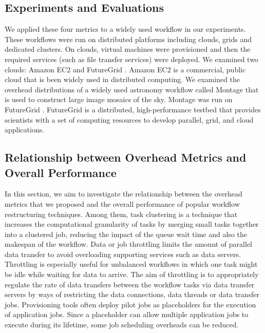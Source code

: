\subsection{Experiments and Evaluations}

We applied these four metrics to a widely used workflow in our experiments. These workflows were run on distributed platforms including clouds, grids and dedicated clusters. 
On clouds, virtual machines were provisioned and then the required services (such as file transfer services) were deployed. 
We examined two clouds: Amazon EC2 \cite{AmazonEC2}  and FutureGrid \cite{FutureGrid}. Amazon EC2 is a commercial, public cloud that is been widely used in distributed computing. 
We examined the overhead distributions of a widely used astronomy workflow called Montage \cite{Berriman2004} that is used to construct large image mosaics of the sky. Montage was run on FutureGrid \cite{FutureGrid}. FutureGrid is a distributed, high-performance testbed that provides scientists with a set of computing resources to develop parallel, grid, and cloud applications. 
\subsection{Relationship between Overhead Metrics and Overall Performance}

In this section, we aim to investigate the relationship between the overhead metrics that we proposed and the overall performance of popular workflow restructuring techniques. Among them, task clustering \cite{Singh2008} is a technique that increases the computational granularity of tasks by merging small tasks together into a clustered job, reducing the impact of the queue wait time and also the makespan of the workflow. Data or job throttling \cite{Humphrey2008} limits the amount of parallel data transfer to avoid overloading supporting services such as data servers. Throttling is especially useful for unbalanced workflows in which one task might be idle while waiting for data to arrive. The aim of throttling is to appropriately regulate the rate of data transfers between the workflow tasks via data transfer servers by ways of restricting the data connections, data threads or data transfer jobs. Provisioning tools often deploy pilot jobs as placeholders for the execution of application jobs. Since a placeholder can allow multiple application jobs to execute during its lifetime, some job scheduling overheads can be reduced. 

